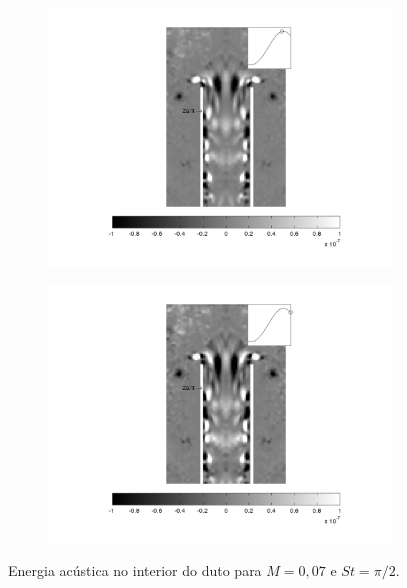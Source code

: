\begin{landscape}
\begin{figure}[ht!]
\begin{subfigure}{0.55 \textwidth}
  \includegraphics[width=1.\linewidth]{figuras/max_ka_007_5.png}
  \caption[]{}
  \label{fig:max_007_5}
\end{subfigure}
\begin{subfigure}{0.55 \textwidth}
  \includegraphics[width=1.\linewidth]{figuras/max_ka_007_6.png}
  \caption[]{}
  \label{fig:max_007_6}
\end{subfigure}
\caption[Energia acústica para $M = 0,07$ e $St = \pi/2$.]{Energia acústica no interior do duto para $M = 0,07$ e $St = \pi/2$.}\label{fig:max_007}
\end{figure}
\vfill
\clearpage
\end{landscape}


